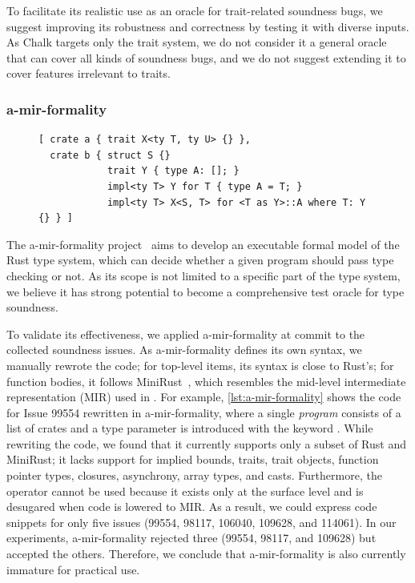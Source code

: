 To facilitate its realistic use as an oracle for trait-related soundness bugs,
we suggest improving its robustness and correctness by testing it with diverse
inputs.
%
As Chalk targets only the trait system, we do not consider it a general oracle
that can cover all kinds of soundness bugs, and we do not suggest extending it
to cover features irrelevant to traits.

\subsubsection{a-mir-formality}

\begin{figure}[t]
\begin{lstlisting}[caption={Issue 99554 in a-mir-formality}, label={lst:a-mir-formality}]
[ crate a { trait X<ty T, ty U> {} },
  crate b { struct S {}
            trait Y { type A: []; }
            impl<ty T> Y for T { type A = T; }
            impl<ty T> X<S, T> for <T as Y>::A where T: Y {} } ]
\end{lstlisting}
\vspace{-1em}
\end{figure}

The a-mir-formality project~\cite{gh-amirformality} aims to develop an
executable formal model of the Rust type system, which can decide whether a
given program should pass type checking or not.
%
As its scope is not limited to a specific part of the type system, we believe it
has strong potential to become a comprehensive test oracle for type soundness.

To validate its effectiveness, we applied a-mir-formality at commit 
to the collected soundness issues.
%
As a-mir-formality defines its own syntax, we manually rewrote the code;
%
for top-level items, its syntax is close to Rust's;
%
for function bodies, it follows MiniRust~\cite{gh-minirust}, which resembles the
mid-level intermediate representation (MIR) used in \rustc{}.
%
For example, \cref{lst:a-mir-formality} shows the code for Issue 99554 rewritten
in a-mir-formality, where a single \emph{program} consists of a list of crates
and a type parameter is introduced with the keyword .
%
While rewriting the code, we found that it currently supports only a subset of
Rust and MiniRust;
%
it lacks support for implied bounds,  traits, trait objects, function
pointer types, closures, asynchrony, array types, and casts.
%
Furthermore, the  operator cannot be used because it exists only at the
surface level and is desugared when code is lowered to MIR.
%
As a result, we could express code snippets for only five issues (99554, 98117,
106040, 109628, and 114061).
%
In our experiments, a-mir-formality rejected three (99554, 98117, and 109628)
but accepted the others.
%
Therefore, we conclude that a-mir-formality is also currently immature for
practical use.

